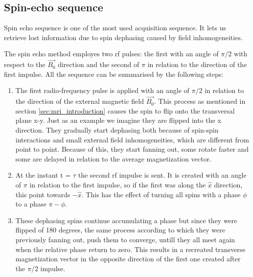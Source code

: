 \documentclass[10pt]{report}
\begin{document}
\subsection{Spin-echo sequence}

Spin echo sequence is one of the most used acquisition sequence. It lets us retrieve lost information due to spin dephasing caused by field inhomogeneities.

The spin echo method employes two rf pulses: the first with an angle of $\pi/2$ with respect to the $\overrightarrow{B_0}$ direction and the second of $\pi$ in relation to the direction of the first impulse.
All the sequence can be summarised by the following steps:
\begin{enumerate}
\item The first radio-frequency pulse is applied with an angle of $\pi/2$ in relation to the direction of the external magnetic field $\overrightarrow{B_0}$. This process as mentioned in section \ref{sec:mri_introduction} causes the spin to flip onto the transversal plane x-y.
Just as an example we imagine they are flipped into the x direction. They gradually start dephasing both because of spin-spin interactions and small external field inhomogeneities, which are different from point to point.
Because of this, they start fanning out, some rotate faster and some are delayed in relation to the average magnetization vector.

\item At the instant t = $\tau $ the second rf impulse is sent. It is created with an angle of $\pi$ in relation to the first impulse, so if the first was along the $\hat x$ direction, this point towards $-\hat x$. This has the effect of turning all spins with a phase $\phi$ to a phase $\pi - \phi$.
\item These dephasing spins continue accumulating a phase but since they were flipped of 180 degrees, the same process according to which they were previously fanning out, push them to converge, untill they all meet again when the relative phase return to zero. This results in a recreated transverse magnetization vector in the opposite direction of the first one created after the $\pi/2$ impulse.
\end{enumerate}
\end{document}
